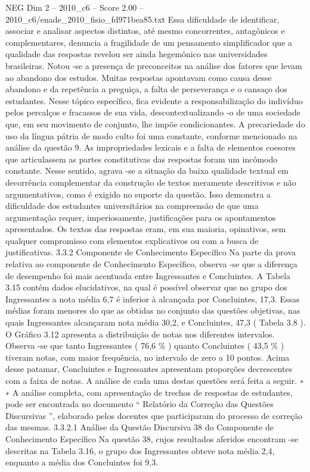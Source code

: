\begin{textsample}{NEG Dim 2 – 2010\_c6 – Score 2.00 – 2010\_c6/enade\_2010\_fisio\_fd971bea85.txt}
Essa dificuldade de identificar, associar e analisar aspectos distintos, até mesmo concorrentes, antagônicos e complementares, denuncia a fragilidade de um pensamento simplificador que a qualidade das respostas revelou ser ainda hegemônico nas universidades brasileiras.
Notou -se a presença de preconceitos na análise dos fatores que levam ao abandono dos estudos.
Muitas respostas apontavam como causa desse abandono e da repetência a preguiça, a falta de perseverança e o cansaço dos estudantes.
Nesse tópico específico, fica evidente a responsabilização do indivíduo pelos percalços e fracassos de sua vida, descontextualizando -o de uma sociedade que, em seu movimento de conjunto, lhe impõe condicionantes.
A precariedade do uso da língua pátria de modo culto foi uma constante, conforme mencionado na análise da questão 9.
As impropriedades lexicais e a falta de elementos coesores que articulassem as partes constitutivas das respostas foram um incômodo constante.
Nesse sentido, agrava -se a situação da baixa qualidade textual em decorrência complementar da construção de textos meramente descritivos e não argumentativos, como é exigido no suporte da questão.
Isso demonstra a dificuldade dos estudantes universitários na compreensão de que uma argumentação requer, imperiosamente, justificações para os apontamentos apresentados.
Os textos das respostas eram, em sua maioria, opinativos, sem qualquer compromisso com elementos explicativos ou com a busca de justificativas. 3.3.2 Componente de Conhecimento Específico Na parte da prova relativa ao componente de Conhecimento Específico, observa -se que a diferença de desempenho foi mais acentuada entre Ingressantes e Concluintes.
A Tabela 3.15 contém dados elucidativos, na qual é possível observar que no grupo dos Ingressantes a nota média 6,7 é inferior à alcançada por Concluintes, 17,3.
Essas médias foram menores do que as obtidas no conjunto das questões objetivas, nas quais Ingressantes alcançaram nota média 30,2, e Concluintes, 47,3 ( Tabela 3.8 ).
O Gráfico 3.12 apresenta a distribuição de notas nos diferentes intervalos.
Observa -se que tanto Ingressantes ( 76,6 \% ) quanto Concluintes ( 43,5 \% ) tiveram notas, com maior frequência, no intervalo de zero a 10 pontos.
Acima desse patamar, Concluintes e Ingressantes apresentam proporções decrescentes com a faixa de notas.
A análise de cada uma destas questões será feita a seguir. ∗ ∗ A análise completa, com apresentação de trechos de respostas de estudantes, pode ser encontrada no documento “ Relatório da Correção das Questões Discursivas ”, elaborado pelos docentes que participaram do processo de correção das mesmas. 3.3.2.1 Análise da Questão Discursiva 38 do Componente de Conhecimento Específico Na questão 38, cujos resultados aferidos encontram -se descritas na Tabela 3.16, o grupo dos Ingressantes obteve nota média 2,4, enquanto a média dos Concluintes foi 9,3.

\end{textsample}
